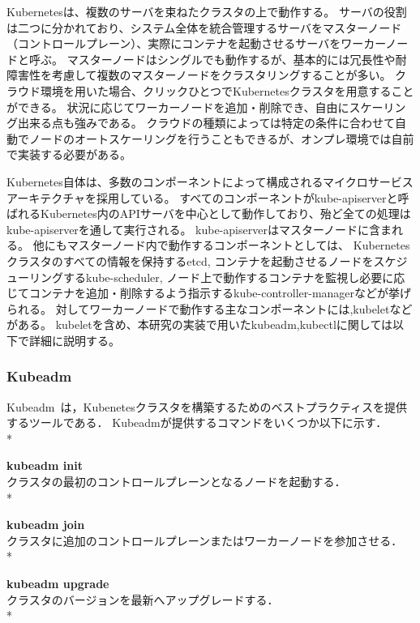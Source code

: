 Kubernetesは、複数のサーバを束ねたクラスタの上で動作する。
サーバの役割は二つに分かれており、システム全体を統合管理するサーバをマスターノード（コントロールプレーン）、実際にコンテナを起動させるサーバをワーカーノードと呼ぶ。
マスターノードはシングルでも動作するが、基本的には冗長性や耐障害性を考慮して複数のマスターノードをクラスタリングすることが多い。
クラウド環境を用いた場合、クリックひとつでKubernetesクラスタを用意することができる。
状況に応じてワーカーノードを追加・削除でき、自由にスケーリング出来る点も強みである。
クラウドの種類によっては特定の条件に合わせて自動でノードのオートスケーリングを行うこともできるが、オンプレ環境では自前で実装する必要がある。

Kubernetes自体は、多数のコンポーネントによって構成されるマイクロサービスアーキテクチャを採用している。
すべてのコンポーネントがkube-apiserverと呼ばれるKubernetes内のAPIサーバを中心として動作しており、殆ど全ての処理はkube-apiserverを通して実行される。
kube-apiserverはマスターノードに含まれる。
他にもマスターノード内で動作するコンポーネントとしては、
Kubernetesクラスタのすべての情報を保持するetcd,
コンテナを起動させるノードをスケジューリングするkube-scheduler,
ノード上で動作するコンテナを監視し必要に応じてコンテナを追加・削除するよう指示するkube-controller-managerなどが挙げられる。
対してワーカーノードで動作する主なコンポーネントには,kubeletなどがある。
kubeletを含め、本研究の実装で用いたkubeadm,kubectlに関しては以下で詳細に説明する。

\subsubsection{Kubeadm}
\label{background:container-orchestration-system:kubernetes:kubeadm}

Kubeadm~\cite{Kubeadm}は，Kubenetesクラスタを構築するためのベストプラクティスを提供するツールである．
Kubeadmが提供するコマンドをいくつか以下に示す．\\*

{\bf kubeadm init}\\
クラスタの最初のコントロールプレーンとなるノードを起動する．\\*

{\bf kubeadm join}\\
クラスタに追加のコントロールプレーンまたはワーカーノードを参加させる．\\*

{\bf kubeadm upgrade}\\
クラスタのバージョンを最新へアップグレードする．\\*

